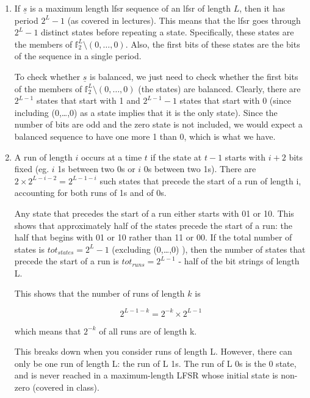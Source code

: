 \usepackage{amsfonts}

\begin{enumerate}

\item If $\underline{s}$ is a maximum length lfsr sequence of an lfsr of length
$L$, then it has period $2^L-1$ (as covered in lectures). This means that the
lfsr goes through $2^L-1$ distinct states before repeating a state.
Specifically, these states are the members of $\mathbb{f}_2^L \setminus
(0,\dots,0)$. Also, the first bits of these states are the bits of the sequence
in a single period.

To check whether $\underline{s}$ is balanced, we just need to check whether the
first bits of the members of $\mathbb{f}_2^L \setminus (0,\dots,0)$ (the states)
are balanced. Clearly, there are $2^{L-1}$ states that start with 1 and
$2^{L-1}-1$ states that start with 0 (since including (0,\dots,0) as a state
implies that it is the only state). Since the number of bits are odd and the
zero state is not included, we would expect a balanced sequence to have one more
1 than 0, which is what we have.

\item A run of length $i$ occurs at a time $t$ if the state at $t-1$ starts with
$i+2$ bits fixed (eg. $i$ 1s between two 0s or $i$ 0s between two 1s). There are
$2 \times 2^{L-i-2} = 2^{L-1-i}$ such states that precede the start of a run of
length i, accounting for both runs of 1s and of 0s.

Any state that precedes the start of a run either starts with 01 or 10. This
shows that approximately half of the states precede the start of a run: the half
that begins with 01 or 10 rather than 11 or 00. If the total number of states is
$tot_{states} = 2^L-1$ (excluding (0,\dots,0) ), then the number of states that
precede the start of a run is $tot_{runs} = 2^{L-1}$ - half of the bit strings
of length L.

This shows that the number of runs of length $k$ is

\[2^{L-1-k} = 2^{-k} \times 2^{L-1}\]

which means that $2^{-k}$ of all runs are of length k.

This breaks down when you consider runs of length L. However, there can only be
one run of length L: the run of L 1s. The run of L 0s is the 0 state, and is
never reached in a maximum-length LFSR whose initial state is non-zero (covered
in class).

\end{enumerate}

